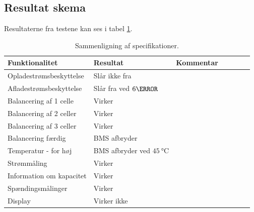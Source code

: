 \subsection{Resultat skema}
Resultaterne fra testene kan ses i tabel \ref{tab:resultat_IC}.


\begin{table}[h!]
	\small
	\centering
	\begin{threeparttable}
		\begin{tabular}{ l l l l l l l }
			\toprule
			\multicolumn{1}{l}{\textbf{Funktionalitet}}          &
			\multicolumn{1}{l}{\textbf{Resultat}}           &
			\multicolumn{1}{l}{\textbf{Kommentar}}   \\ 
			\hline
			Opladestrømsbeskyttelse        & Slår ikke fra  &      \\
			Afladestrømsbeskyttelse        & Slår fra ved $6\ampere$   &      \\
			Balancering af 1 celle         & Virker                    &      \\
			Balancering af 2 celler        & Virker                    &      \\
			Balancering af 3 celler        & Virker                    &      \\
			Balancering færdig             & BMS afbryder              &      \\
			Temperatur - for høj           & BMS afbryder ved   $\SI{45}{\celsius}$       &      \\
			Strømmåling                    & Virker                    &      \\
			Information om kapacitet       & Virker                    &      \\
			Spændingsmålinger              & Virker                    &      \\
			Display                        & Virker ikke               &      \\
			
			\bottomrule
		\end{tabular}
		\caption{Sammenligning af specifikationer.}
		\label{tab:resultat_IC}
	\end{threeparttable}
\end{table} 
\FloatBlock



